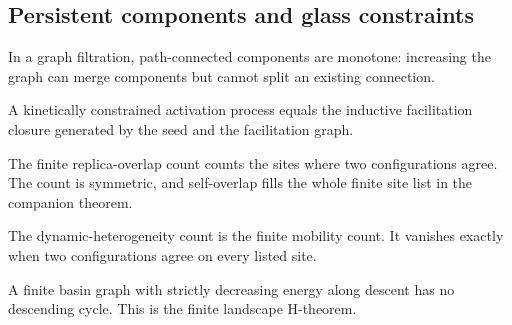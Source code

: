 \subsection{Persistent components and glass constraints}

\begin{theorem}\label{thm:persistent-h0-components-merge}\leanok{}
In a graph filtration, path-connected components are monotone: increasing the
graph can merge components but cannot split an existing connection.
\end{theorem}

\begin{theorem}\label{thm:kcm-activation-closure}\leanok{}
A kinetically constrained activation process equals the inductive facilitation
closure generated by the seed and the facilitation graph.
\end{theorem}

\begin{theorem}\label{thm:glass-overlap-symmetric}\leanok{}
The finite replica-overlap count counts the sites where two configurations
agree.  The count is symmetric, and self-overlap fills the whole finite site
list in the companion theorem.
\end{theorem}

\begin{theorem}\label{thm:glass-mobility-zero-agreement}\leanok{}
The dynamic-heterogeneity count is the finite mobility count.  It vanishes
exactly when two configurations agree on every listed site.
\end{theorem}

\begin{theorem}\label{thm:basin-no-descending-cycle}\leanok{}
A finite basin graph with strictly decreasing energy along descent has no
descending cycle. This is the finite landscape H-theorem.
\end{theorem}

